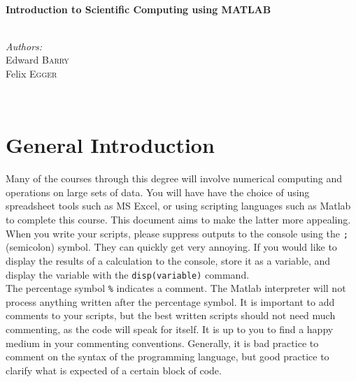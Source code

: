\documentclass[12pt]{article}
\begin{document}
\begin{titlepage}
\HRule \\[0.4cm]
{ \large \bfseries Introduction to Scientific Computing using MATLAB}\\[0.4cm] %
\HRule \\[1.5cm]
 

\begin{minipage}{0.4\textwidth}
\textit{Authors:}\\Edward \textsc{Barry} \\ Felix \textsc{Egger}\\ %


\end{minipage}\\[2cm]



\end{titlepage}

\tableofcontents

\newpage

\section*{General Introduction}
Many of the courses through this degree will involve numerical computing and operations on large sets of data. You will have have the choice of using spreadsheet tools such as MS Excel, or using scripting languages such as Matlab to complete this course. This document aims to make the latter more appealing.\\


When you write your scripts, please suppress outputs to the console using the \texttt{;} (semicolon) symbol. They can quickly get very annoying. If you would like to display the results of a calculation to the console, store it as a variable, and display the variable with the \texttt{disp(variable)} command. \\

The percentage symbol \texttt{\%} indicates a comment. The Matlab interpreter will not process anything written after the percentage symbol. It is important to add comments to your scripts, but the best written scripts should not need much commenting, as the code will speak for itself. It is up to you to find a happy medium in your commenting conventions. Generally, it is bad practice to comment on the syntax of the programming language, but good practice to clarify what is expected of a certain block of code. 
\end{document}
